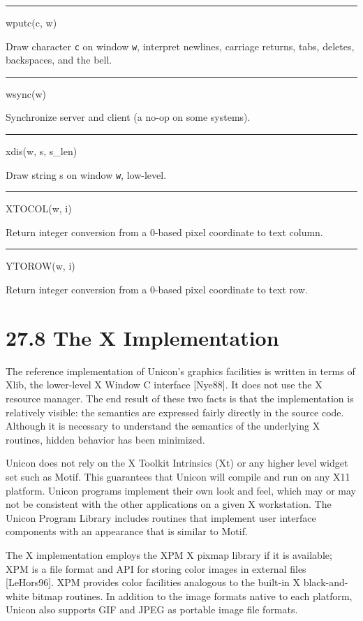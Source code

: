 \bigskip\hrule\vspace{0.1cm}
\noindent
wputc(c, w)


Draw character \texttt{c} on window \texttt{w}, interpret newlines,
carriage returns, tabs, deletes, backspaces, and the bell.


\bigskip\hrule\vspace{0.1cm}
\noindent
wsync(w)


Synchronize server and client (a no-op on some systems).


\bigskip\hrule\vspace{0.1cm}
\noindent
xdis(w, s, s\_len)


Draw string s on window \texttt{w}, low-level.


\bigskip\hrule\vspace{0.1cm}
\noindent
XTOCOL(w, i)


Return integer conversion from a 0-based pixel coordinate to text column.


\bigskip\hrule\vspace{0.1cm}
\noindent
YTOROW(w, i)


Return integer conversion from a 0-based pixel coordinate to text row.

\section[27.8 The X Implementation]{27.8 The X Implementation}

The reference implementation of Unicon's graphics facilities is
written in terms of Xlib, the lower-level X Window C interface
[Nye88]. It does not use the X resource manager. The end result of
these two facts is that the implementation is relatively visible: the
semantics are expressed fairly directly in the source code. Although
it is necessary to understand the semantics of the underlying X
routines, hidden behavior has been minimized.

Unicon does not rely on the X Toolkit Intrinsics (Xt) or any higher
level widget set such as Motif. This guarantees that Unicon will
compile and run on any X11 platform. Unicon programs implement their
own look and feel, which may or may not be consistent with the other
applications on a given X workstation. The Unicon Program Library
includes routines that implement user interface components with an
appearance that is similar to Motif.

The X implementation employs the XPM X pixmap library if it is
available; XPM is a file format and API for storing color
images in external files [LeHors96]. XPM provides color facilities
analogous to the built-in X black-and-white bitmap routines. In
addition to the image formats native to each platform, Unicon also
supports GIF and JPEG as portable image file formats.


